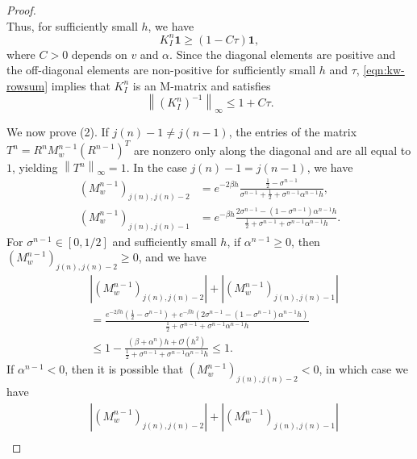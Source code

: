\documentclass[11pt,reqno]{amsart}
\theoremstyle{plain}
\theoremstyle{definition}
\numberwithin{equation}{section}
\newcommand{\paren}[1]{\left(#1\right)}
\newcommand{\mc}[1]{\mathcal{#1}}
\newcommand{\bm}[1]{\boldsymbol{#1}}
\newcommand{\abs}[1]{\left\lvert #1 \right\rvert}
\newcommand{\norm}[1]{\left\lVert #1 \right\rVert}
\begin{document}
\begin{proof}
\begin{equation}
\end{equation}
Thus, for sufficiently small $h$, we have
\begin{equation}\label{eqn:kw-rowsum}
    K_I^n\bm 1 \ge \paren{1 - C\tau}\bm 1,
\end{equation}
where $C>0$ depends on $v$ and $\alpha$.
Since the diagonal elements are positive and the off-diagonal elements are non-positive for sufficiently small $h$ and $\tau$, \eqref{eqn:kw-rowsum} implies that $K_I^n$ is an M-matrix and satisfies
\begin{equation}
    \norm{(K_I^n)^{-1}}_\infty \le 1 + C\tau.
\end{equation}





We now prove (2).
If $j(n)-1 \neq j(n-1)$, the entries of the matrix $T^n=R^n M_w^{n-1} (R^{n-1})^T$ are nonzero only along the diagonal and are all equal to $1$, yielding $\norm{T^n}_\infty=1$.
In the case $j(n)-1 = j(n-1)$, we have
\begin{align}
    \paren{M_w^{n-1}}_{j(n), j(n)-2} &= e^{-2\beta h}\frac{\frac{1}{2}-\sigma^{n-1}}{\sigma^{n-1}+\frac{1}{2}+\sigma^{n-1}\alpha^{n-1}h},\\
    \paren{M_w^{n-1}}_{j(n), j(n)-1} &= e^{-\beta h}\frac{2\sigma^{n-1} - \paren{1-\sigma^{n-1}} \alpha^{n-1} h }{ \frac{1}{2} + \sigma^{n-1} + \sigma^{n-1} \alpha^{n-1} h }.
\end{align}
For $\sigma^{n-1} \in[0,1/2]$ and sufficiently small $h$, if $\alpha^{n-1}\ge 0$, then $\paren{M_w^{n-1}}_{j(n), j(n)-2} \ge 0$, and we have
\begin{equation}\label{eqn:Mwrowjn}
\begin{aligned}
    &\abs{\paren{M_w^{n-1}}_{j(n), j(n)-2}} + \abs{\paren{M_w^{n-1}}_{j(n), j(n)-1}} \\
    &= \frac{ e^{-2\beta h}\paren{\frac{1}{2}-\sigma^{n-1}} + e^{-\beta h}\paren{ 2\sigma^{n-1} - \paren{1-\sigma^{n-1}} \alpha^{n-1} h }}{ \frac{1}{2} + \sigma^{n-1} + \sigma^{n-1} \alpha^{n-1} h } \\
    &\le 1 - \frac{\paren{\beta+\alpha^n}h + \mc O(h^2) }{ \frac{1}{2} + \sigma^{n-1} + \sigma^{n-1} \alpha^{n-1} h } \le 1.
\end{aligned}
\end{equation}
If $\alpha^{n-1}<0$, then it is possible that $\paren{M_w^{n-1}}_{j(n), j(n)-2} < 0$, in which case we have
\begin{equation}
\begin{aligned}
    &\abs{\paren{M_w^{n-1}}_{j(n), j(n)-2}} + \abs{\paren{M_w^{n-1}}_{j(n), j(n)-1}} \\

\end{aligned}
\end{equation}
\end{proof}
\end{document}
